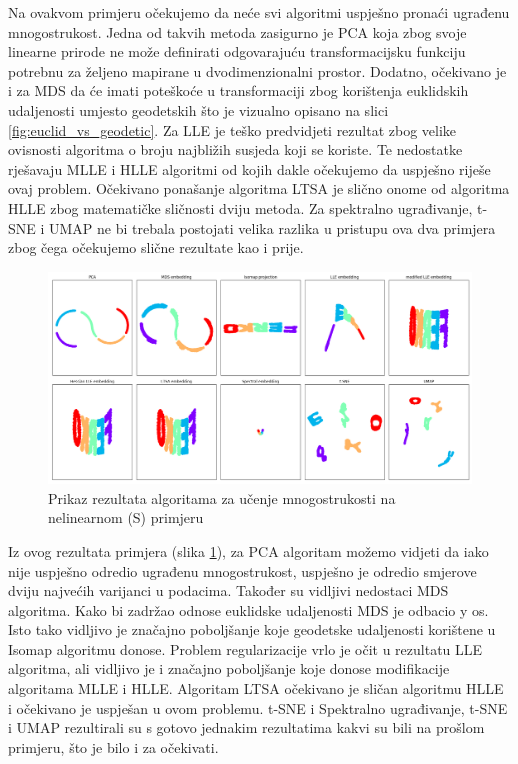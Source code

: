 \documentclass[times, utf8, diplomski]{fer}
\begin{document}
\bigskip
Na ovakvom primjeru očekujemo da neće svi algoritmi uspješno pronaći ugrađenu mnogostrukost. Jedna od takvih metoda zasigurno je PCA koja zbog svoje linearne prirode ne može definirati odgovarajuću transformacijsku funkciju potrebnu za željeno mapirane u dvodimenzionalni prostor. Dodatno, očekivano je i za MDS da će imati poteškoće u transformaciji zbog korištenja euklidskih udaljenosti umjesto geodetskih što je vizualno opisano na slici \ref{fig:euclid_vs_geodetic}. Za LLE je teško predvidjeti rezultat zbog velike ovisnosti algoritma o broju najbližih susjeda koji se koriste. Te nedostatke rješavaju MLLE i HLLE algoritmi od kojih dakle očekujemo da uspješno riješe ovaj problem. Očekivano ponašanje algoritma LTSA je slično onome od algoritma HLLE zbog matematičke sličnosti dviju metoda. Za spektralno ugrađivanje, t-SNE i UMAP ne bi trebala postojati velika razlika u pristupu ova dva primjera zbog čega očekujemo slične rezultate kao i prije.

\begin{figure}[htb]
    \centering
    \includegraphics[width=\textwidth]{resources/images/reduction/compare/xs.png}
    \caption{Prikaz rezultata algoritama za učenje mnogostrukosti na nelinearnom (S) primjeru}
    \label{fig:xs}
\end{figure}

Iz ovog rezultata primjera (slika \ref{fig:xs}), za PCA algoritam možemo vidjeti da iako nije uspješno odredio ugrađenu mnogostrukost, uspješno je odredio smjerove dviju najvećih varijanci u podacima. Također su vidljivi nedostaci MDS algoritma. Kako bi zadržao odnose euklidske udaljenosti MDS je odbacio y os. Isto tako vidljivo je značajno poboljšanje koje geodetske udaljenosti korištene u Isomap algoritmu donose. Problem regularizacije vrlo je očit u rezultatu LLE algoritma, ali vidljivo je i značajno poboljšanje koje donose modifikacije algoritama MLLE i HLLE. Algoritam LTSA očekivano je sličan algoritmu HLLE i očekivano je uspješan u ovom problemu. t-SNE i Spektralno ugrađivanje, t-SNE i UMAP rezultirali su s gotovo jednakim rezultatima kakvi su bili na prošlom primjeru, što je bilo i za očekivati.
\end{document}
